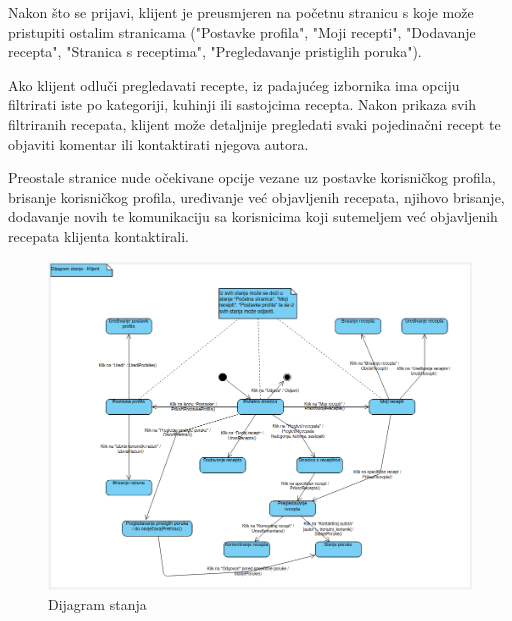 		\noindent Nakon što se prijavi, klijent je preusmjeren na početnu stranicu s koje može
		pristupiti ostalim stranicama ("Postavke profila", "Moji recepti", "Dodavanje recepta", "Stranica s receptima",
		"Pregledavanje pristiglih poruka").

		\noindent Ako klijent odluči pregledavati recepte, iz padajućeg izbornika ima opciju
		filtrirati iste po kategoriji, kuhinji ili sastojcima recepta. Nakon prikaza svih filtriranih
		recepata, klijent može detaljnije pregledati svaki pojedinačni recept te objaviti komentar ili
		kontaktirati njegova autora.

		\noindent Preostale stranice nude očekivane opcije vezane uz postavke korisničkog profila,
		brisanje korisničkog profila, uređivanje već objavljenih recepata, njihovo brisanje, dodavanje novih
		te komunikaciju sa korisnicima koji sutemeljem već objavljenih recepata klijenta kontaktirali.

		\begin{figure}[H]
			\includegraphics[scale=0.42]{dijagrami/dijagram_stanja.png}
			\centering
			\caption{Dijagram stanja}
			\label{fig:bpdiag}
		\end{figure}
		\eject 